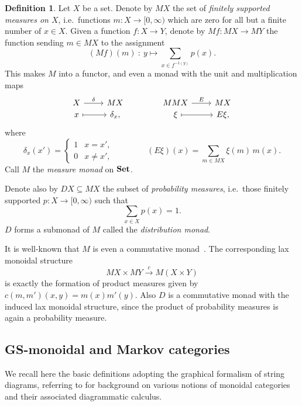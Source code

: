 \documentclass[a4paper,UKenglish,numberwithinsect,cleveref, autoref, thm-restate]{lipics-v2021}
\theoremstyle{plain} %
\theoremstyle{definition} %
\newtheorem{mydefinition}[mytheorem]{Definition}
\begin{document}
\begin{mydefinition}\label{monadM}
 Let $X$ be a set. Denote by $MX$ the set of \emph{finitely supported measures on $X$}, i.e.~functions $m:X\to[0,\infty)$ which are zero for all but a finite number of $x\in X$. 
 Given a function $f:X\to Y$, denote by $Mf:MX\to MY$ the function sending $m\in MX$ to the assignment
 \[
	 (Mf)(m) \: : \: y \longmapsto \sum_{x\in f^{-1(y)}} p(x) .
 \]
 This makes $M$ into a functor, and even a monad with the unit and multiplication maps
 \[
  \begin{tikzcd}[row sep=0]
   X \ar{r}{\delta} & MX \\
   x \ar[mapsto]{r} & \delta_x ,
  \end{tikzcd}
  \qquad\qquad
  \begin{tikzcd}[row sep=0]
   MMX \ar{r}{E} & MX \\
   \xi \ar[mapsto]{r} & E\xi ,
  \end{tikzcd}
 \]
 where 
 \[
  \delta_x(x') = \begin{cases}
                  1 & x=x' , \\
                  0 & x\ne x',
                 \end{cases}
 \qquad\qquad
 (E\xi)(x) = \sum_{m\in MX} \xi(m)\,m(x) .
 \]
 Call $M$ the \emph{measure monad} on $\mathbf{Set}$.

 Denote also by $DX\subseteq MX$ the subset of \emph{probability measures}, i.e.~those finitely supported $p:X\to[0,\infty)$ such that
 \[
  \sum_{x\in X} p(x) = 1 .
 \]
 $D$ forms a submonad of $M$ called the \emph{distribution monad}.
\end{mydefinition}

It is well-known that $M$ is even a commutative monad~\cite{coumans2013scalars}.
The corresponding lax monoidal structure
\[
	MX \times MY \stackrel{c}{\longrightarrow} M(X \times Y)
\]
is exactly the formation of product measures given by $c(m, m')(x, y) = m(x) m'(y)$.
Also $D$ is a commutative monad with the induced lax monoidal structure, since the product of probability measures is again a probability measure.

\subsection{GS-monoidal and Markov categories}


We recall here the basic definitions adopting the graphical formalism of string diagrams,
referring to \cite{Selinger2011} for background on various notions of monoidal categories and their associated diagrammatic calculus.
\end{document}
